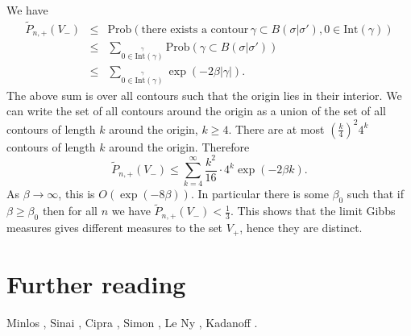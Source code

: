 \documentclass{article}
\newcommand{\Prob}{\text{Prob}}
\newcommand{\Int}{\text{Int}}
\begin{document}
We have
\begin{eqnarray*}
\widetilde{P}_{n,+}(V_-)&\leq&\Prob\left(\textrm{there exists a contour} \, \gamma \subset B(\sigma|\sigma'), 0 \in \Int(\gamma)\right)\\
&\leq&\sum_{\stackrel{\gamma}{0 \in \Int(\gamma)}} \Prob(\gamma \subset B(\sigma|\sigma'))\\
&\leq&\sum_{\stackrel{\gamma}{0 \in \Int(\gamma)}} \exp(-2\beta|\gamma|).
\end{eqnarray*}
The above sum is over all contours such that the origin lies in their interior. We can write the set of all contours around the origin as a union of the set of all contours of length $k$ around the origin, $k \geq 4$. There are at most $\left( \frac{k}{4} \right)^2 4^k$ contours of length $k$ around the origin. Therefore
\[
\widetilde{P}_{n,+}(V_-)\leq\sum_{k=4}^\infty \frac{k^2}{16} \cdot 4^k \exp(-2\beta k).
\]
As $\beta \to \infty$, this is $O(\exp(-8\beta))$. In particular there is some $\beta_0$ such that if $\beta \geq \beta_0$ then for all $n$ we have $\widetilde{P}_{n,+}(V_-)< \frac{1}{3}$. This shows
that the limit Gibbs measures gives different measures to the set $V_+$, hence they are distinct. 

\section*{Further reading}
Minlos \cite{minlos}, Sinai \cite{MR691854}, Cipra \cite{MR936054}, Simon \cite{simon},  Le Ny \cite{ny}, Kadanoff \cite{kadanoff}.



\end{document}
